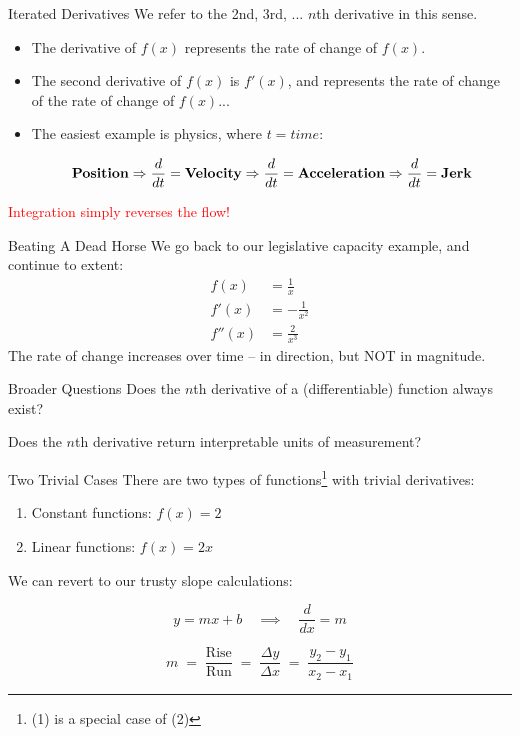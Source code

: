 \documentclass[10pt]{beamer}
\begin{document}
\begin{frame}{Iterated Derivatives}
    We refer to the 2nd, 3rd, ... $n$th derivative in this sense.

    \begin{itemize}
        \item The derivative of $f(x)$ represents the rate of change of $f(x)$.
        \item The second derivative of $f(x)$ is $f'(x)$, and represents the rate of change of the rate of change of $f(x)$...
        \item The easiest example is physics, where $t = time$:

        \[\text{\textbf{Position}} \Rightarrow \frac{d}{dt} = \text{\textbf{Velocity}} \Rightarrow \frac{d}{dt} = \text{\textbf{Acceleration}} \Rightarrow \frac{d}{dt} = \text{\textbf{Jerk}}\]
    \end{itemize}

    \textcolor{red}{Integration simply reverses the flow!}
\end{frame}

\begin{frame}{Beating A Dead Horse}
    We go back to our legislative capacity example, and continue to extent:
    \begin{align*}
        f(x) &= \frac{1}{x} \\
        f'(x) &= -\frac{1}{x^2} \\
        f''(x) &= \frac{2}{x^3}
    \end{align*}
    The rate of change increases over time -- in direction, but NOT in magnitude.
\end{frame}

\begin{frame}{Broader Questions}
    Does the $n$th derivative of a (differentiable) function always exist? 

    \pause

    Does the $n$th derivative return interpretable units of measurement?
\end{frame}

\begin{frame}{Two Trivial Cases}
    There are two types of functions\footnote{(1) is a special case of (2)} with trivial derivatives:

    \begin{enumerate}
        \item Constant functions: $f(x)=2$
        \item Linear functions: $f(x) = 2x$
    \end{enumerate}

    We can revert to our trusty slope calculations:

    \[y = mx+ b \quad \implies \quad \frac{d}{dx} = m \]

    \[m \;=\; \frac{\text{Rise}}{\text{Run}} \;=\; \frac{\Delta y}{\Delta x} \;=\; \frac{y_2 - y_1}{x_2 - x_1}\]
\end{frame}
\end{document}
